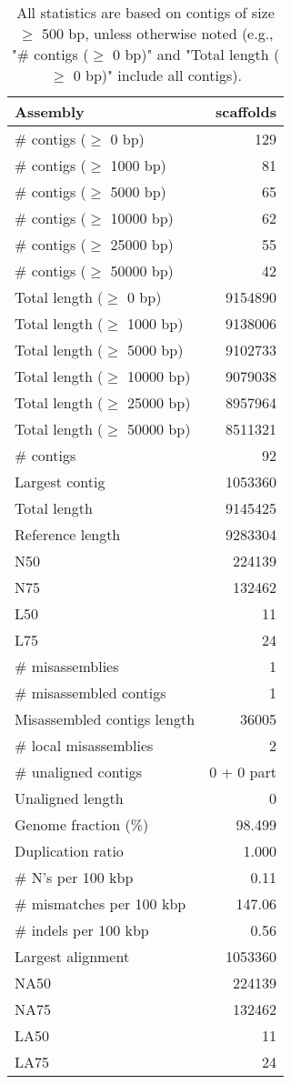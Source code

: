 \documentclass[12pt,a4paper]{article}
\begin{document}
\begin{table}[ht]
\begin{center}
\caption{All statistics are based on contigs of size $\geq$ 500 bp, unless otherwise noted (e.g., "\# contigs ($\geq$ 0 bp)" and "Total length ($\geq$ 0 bp)" include all contigs).}
\begin{tabular}{|l*{1}{|r}|}
\hline
Assembly & scaffolds \\ \hline
\# contigs ($\geq$ 0 bp) & 129 \\ \hline
\# contigs ($\geq$ 1000 bp) & 81 \\ \hline
\# contigs ($\geq$ 5000 bp) & 65 \\ \hline
\# contigs ($\geq$ 10000 bp) & 62 \\ \hline
\# contigs ($\geq$ 25000 bp) & 55 \\ \hline
\# contigs ($\geq$ 50000 bp) & 42 \\ \hline
Total length ($\geq$ 0 bp) & 9154890 \\ \hline
Total length ($\geq$ 1000 bp) & 9138006 \\ \hline
Total length ($\geq$ 5000 bp) & 9102733 \\ \hline
Total length ($\geq$ 10000 bp) & 9079038 \\ \hline
Total length ($\geq$ 25000 bp) & 8957964 \\ \hline
Total length ($\geq$ 50000 bp) & 8511321 \\ \hline
\# contigs & 92 \\ \hline
Largest contig & 1053360 \\ \hline
Total length & 9145425 \\ \hline
Reference length & 9283304 \\ \hline
N50 & 224139 \\ \hline
N75 & 132462 \\ \hline
L50 & 11 \\ \hline
L75 & 24 \\ \hline
\# misassemblies & 1 \\ \hline
\# misassembled contigs & 1 \\ \hline
Misassembled contigs length & 36005 \\ \hline
\# local misassemblies & 2 \\ \hline
\# unaligned contigs & 0 + 0 part \\ \hline
Unaligned length & 0 \\ \hline
Genome fraction (\%) & 98.499 \\ \hline
Duplication ratio & 1.000 \\ \hline
\# N's per 100 kbp & 0.11 \\ \hline
\# mismatches per 100 kbp & 147.06 \\ \hline
\# indels per 100 kbp & 0.56 \\ \hline
Largest alignment & 1053360 \\ \hline
NA50 & 224139 \\ \hline
NA75 & 132462 \\ \hline
LA50 & 11 \\ \hline
LA75 & 24 \\ \hline
\end{tabular}
\end{center}
\end{table}
\end{document}
